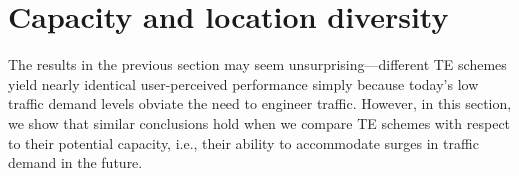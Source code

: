 \section{Capacity and location diversity}
\label{sec:capacity}




%	

%	
%	








The results in the previous section may seem unsurprising---different TE schemes yield nearly identical user-perceived performance simply because today's low traffic demand levels obviate the need to engineer traffic. However, in this section, we show that similar conclusions hold when we compare TE schemes with respect to their potential capacity, i.e., their ability to accommodate surges in traffic demand in the future.

